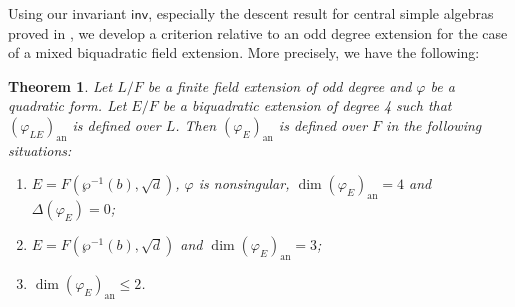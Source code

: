 \documentclass{amsart}
\newtheorem{theorem}[definition]{Theorem}
\numberwithin{equation}{section}
\newcommand{\an}{\mathrm{an}} %
\newcommand{\inv}{\mathsf{inv}}
\begin{document}
Using our invariant $\inv$, especially the descent result for central simple algebras proved in , we develop a criterion relative to an odd degree extension for the case of a mixed biquadratic field extension.
More precisely, we have the following:

\begin{theorem} \label{thm_descentQF}
    Let $L/F$ be a finite field extension of odd degree and $\varphi$ be a quadratic form.
    Let $E / F$ be a biquadratic extension of degree 4 such that $(\varphi_{LE})_\an$ is defined over $L$.
    Then $(\varphi_E)_\an$ is defined over $F$ in the following situations:
    \begin{enumerate}
        \item \label{thm_descentQF4} $E = F(\wp^{-1}(b), \sqrt d)$, $\varphi$ is nonsingular, $\dim(\varphi_E)_\an = 4$ and $\Delta(\varphi_E) = 0$;
        \item \label{thm_descentQF3} $E = F(\wp^{-1}(b), \sqrt d)$ and $\dim(\varphi_{E})_\an = 3$;
        \item \label{thm_descentQFleq2} $\dim(\varphi_{E})_\an \leq 2$.
    \end{enumerate}
\end{theorem}
\end{document}
